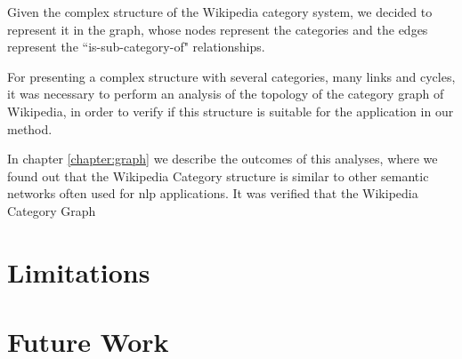 Given the complex structure of the Wikipedia category system, we decided to represent it in the graph, whose nodes represent the categories and the edges represent the ``is-sub-category-of" relationships.

For presenting a complex structure with several categories, many links and cycles, it was necessary to perform an analysis of the topology of the category graph of Wikipedia, in order to verify if this structure is suitable for the application in our method.

In chapter  \ref{chapter:graph} we describe the outcomes of this analyses, where we found out that the Wikipedia Category structure is similar to other semantic networks often used for \gls{nlp} applications. It was verified that the Wikipedia Category Graph 

\section{\hspace*{3pt}  Limitations}


\section{\hspace*{3pt}  Future Work}